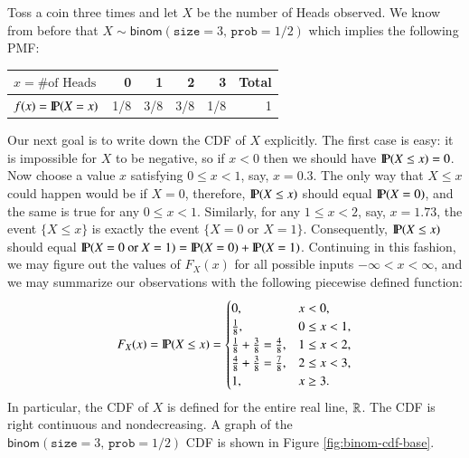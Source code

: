 \documentclass[captions=tableheading]{scrbook}
\begin{document}
\begin{example}
\label{exa:toss-coin-3-withR}
Toss a coin three times and let \(X\) be the number of Heads observed. We know from before that \(X\sim\mathsf{binom}(\mathtt{size}=3,\,\mathtt{prob}=1/2)\) which implies the following PMF:

\begin{center}
\begin{tabular}{lrrrrr}
 \(x=\mbox{\#of Heads}\)  &    0  &    1  &    2  &    3  &  Total  \\
\hline
 \(f(x) = \P(X = x)\)     &  1/8  &  3/8  &  3/8  &  1/8  &      1  \\
\end{tabular}
\end{center}


Our next goal is to write down the CDF of \(X\) explicitly. The first case is easy: it is impossible for \(X\) to be negative, so if \(x<0\) then we should have \(\P(X\leq x)=0\). Now choose a value \(x\) satisfying \(0\leq x<1\), say, \(x=0.3\). The only way that \(X\leq x\) could happen would be if \(X=0\), therefore, \(\P(X\leq x)\) should equal \(\P(X=0)\), and the same is true for any \(0\leq x<1\). Similarly, for any \(1\leq x<2\), say, \(x=1.73\), the event \(\{ X\leq x \}\) is exactly the event \(\{ X=0\mbox{ or }X=1 \}\). Consequently, \(\P(X\leq x)\) should equal \(\P(X=0\mbox{ or }X=1)=\P(X=0)+\P(X=1)\). Continuing in this fashion, we may figure out the values of \(F_{X}(x)\) for all possible inputs \(-\infty<x<\infty\), and we may summarize our observations with the following piecewise defined function:
\[
F_{X}(x)=\P(X\leq x)=
\begin{cases}
0, & x<0,\\
\frac{1}{8}, & 0\leq x<1,\\
\frac{1}{8}+\frac{3}{8}=\frac{4}{8}, & 1\leq x<2,\\
\frac{4}{8}+\frac{3}{8}=\frac{7}{8}, & 2\leq x<3,\\
1, & x\geq3.
\end{cases}
\]
In particular, the CDF of \(X\) is defined for the entire real line, \(\R\). The CDF is right continuous and nondecreasing. A graph of the \(\mathsf{binom}(\mathtt{size}=3,\,\mathtt{prob}=1/2)\) CDF is shown in Figure \ref{fig:binom-cdf-base}.
\end{example}
\end{document}
